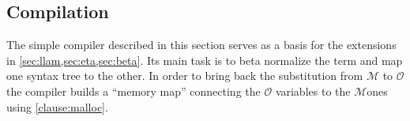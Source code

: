 \documentclass[sigconf,natbib=false,review]{acmart}
\newcommand{\llambda}{\ensuremath{\mathcal{L}}\xspace}
\newcommand{\Fo}{\texorpdfstring{\ensuremath{\mathcal{O}}\xspace}{O}}
\newcommand{\Ho}{\texorpdfstring{\ensuremath{\mathcal{M}}\xspace}{M}}
\begin{document}







\subsection{Compilation}
\label{sec:compilation}

The simple compiler described in this section serves as a basis for the
extensions in \cref{sec:llam,sec:eta,sec:beta}.
Its main task is to beta normalize the term and map one syntax tree to
the other.
In order to bring back the substitution from \Ho{} to \Fo{} the compiler
builds a ``memory map'' connecting the \Fo{} variables to the \Ho ones
using %
\ref{clause:malloc}.
\end{document}
